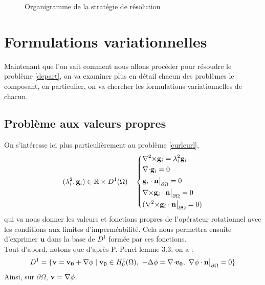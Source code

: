 \begin{figure}[H]
\caption{Organigramme de la stratégie de résolution}\label{org1}
\end{figure}

\chapter{Formulations variationnelles}
\label{fv}
Maintenant que l'on sait comment nous allons procéder pour résoudre le problème \ref{depart}, on va examiner plus en détail chacun des problèmes le composant, en particulier, on va chercher les formulations variationnelles de chacun.

\section{Problème aux valeurs propres}
\label{eigen}
On s'intéresse ici plus particulièrement au problème \ref{curlcurl},
\begin{equation*}
(\lambda_i^2,\mathbf{g}_i)\in{\mathbb{R}}\times D^1(\Omega)\quad \left\{\begin{aligned}
&{\nabla^2\times}  \mathbf{g}_i = \lambda_i^2 \mathbf{g}_i\\
&{\nabla\cdot} \mathbf{g}_i = 0\\
&\mathbf{g}_i\cdot \mathbf{n}{\big\rvert_{\partial\Omega}} = 0\\
&{\nabla\times} \mathbf{g}_i\cdot \mathbf{n}{\big\rvert_{\partial\Omega}} = 0\\
&({\nabla^2\times}  \mathbf{g}_i\cdot \mathbf{n}{\big\rvert_{\partial\Omega}} = 0)
\end{aligned}\right.
\end{equation*}
qui va nous donner les valeurs et fonctions propres de l'opérateur rotationnel avec les conditions aux limites d'imperméabilité. Cela nous permettra ensuite d'exprimer $\mathbf{u}$ dans la base de $D^1$ formée par ces fonctions.\\

Tout d'abord, notons que d'après P. Penel \cite{Penel2004} lemme 3.3, on a :
\[ D^1 = \{\mathbf{v}=\mathbf{v_0}+\grad\phi\; |\; \mathbf{v_0}\in H^1_0(\Omega),\ -\laplace\phi=\div\bm{v_0},\ \grad\phi\cdot \mathbf{n}\restr = 0 \} \]
Ainsi, sur $\partial\Omega$, $\mathbf{v}={\nabla}\phi$.\\

